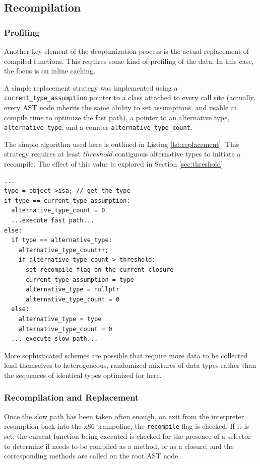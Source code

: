 \documentclass[journal,comsoc]{IEEEtran}
\begin{document}
\subsection{Recompilation}
	\label{sec:recompilation}
	\subsubsection{Profiling}
		Another key element of the deoptimization process is the actual replacement of compiled functions. This requires some kind of profiling of the data. In this case, the focus is on inline caching.
		
		A simple replacement strategy was implemented using a \lstinline|current_type_assumption| pointer to a class attached to every call site (actually, every AST node inherits the same ability to set assumptions, and usable at compile time to optimize the fast path), a pointer to an alternative type, \lstinline|alternative_type|, and a counter \lstinline|alternative_type_count|.
		
		The simple algorithm used here is outlined in Listing \ref{lst:replacement}. This strategy requires at least $threshold$ contiguous alternative types to initiate a recompile. The effect of this value is explored in Section \ref{sec:threshold}
\begin{lstlisting}[caption={Recompilation Strategy Pseudocode}, label={lst:replacement},basicstyle=\footnotesize]
...
type = object->isa; // get the type
if type == current_type_assumption:
  alternative_type_count = 0
  ...execute fast path...
else:
  if type == alternative_type:
  	alternative_type_count++;
  	if alternative_type_count > threshold:
  	  set recompile flag on the current closure
  	  current_type_assumption = type
  	  alternative_type = nullptr
  	  alternative_type_count = 0
  else:
  	alternative_type = type
  	alternative_type_count = 0
  ... execute slow path...
\end{lstlisting}		

	More sophisticated schemes are possible that require more data to be collected lend themselves to heterogeneous, randomized mixtures of data types rather than the sequences of identical types optimized for here.
	
	\subsubsection{Recompilation and Replacement}
	Once the slow path has been taken often enough, on exit from the interpreter resumption back into the x86 trampoline, the \lstinline|recompile| flag is checked. If it is set, the current function being executed is checked for the presence of a selector to determine if needs to be compiled as a method, or as a closure, and the corresponding methods are called on the root AST node.
	
\end{document}
